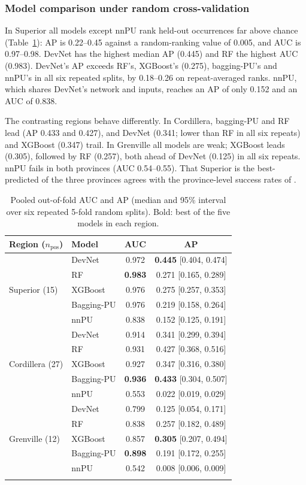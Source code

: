 \documentclass[pdflatex,sn-apa]{sn-jnl}
\begin{document}
\subsubsection{Model comparison under random cross-validation}\label{sec:res-random}

In Superior all models except nnPU rank held-out occurrences far above chance (Table~\ref{tab:benchmark}): AP is 0.22--0.45 against a random-ranking value of 0.005, and AUC is 0.97--0.98. DevNet has the highest median AP (0.445) and RF the highest AUC (0.983). DevNet's AP exceeds RF's, XGBoost's (0.275), bagging-PU's and nnPU's in all six repeated splits, by 0.18--0.26 on repeat-averaged ranks. nnPU, which shares DevNet's network and inputs, reaches an AP of only 0.152 and an AUC of 0.838.

The contrasting regions behave differently. In Cordillera, bagging-PU and RF lead (AP 0.433 and 0.427), and DevNet (0.341; lower than RF in all six repeats) and XGBoost (0.347) trail. In Grenville all models are weak; XGBoost leads (0.305), followed by RF (0.257), both ahead of DevNet (0.125) in all six repeats. nnPU fails in both provinces (AUC 0.54--0.55). That Superior is the best-predicted of the three provinces agrees with the province-level success rates of \citet{Parsa2024}.

\begin{table}[t]
\caption{Pooled out-of-fold AUC and AP (median and 95\% interval over six repeated 5-fold random splits). Bold: best of the five models in each region.}\label{tab:benchmark}
\footnotesize
\begin{tabular*}{\textwidth}{@{\extracolsep\fill}llcc}
\toprule
Region ($n_{\mathrm{pos}}$) & Model & AUC & AP \\
\midrule
\multirow{5}{*}{Superior (15)} & DevNet & 0.972 & \textbf{0.445} [0.404, 0.474] \\
 & RF & \textbf{0.983} & 0.271 [0.165, 0.289] \\
 & XGBoost & 0.976 & 0.275 [0.257, 0.353] \\
 & Bagging-PU & 0.976 & 0.219 [0.158, 0.264] \\
 & nnPU & 0.838 & 0.152 [0.125, 0.191] \\
\midrule
\multirow{5}{*}{Cordillera (27)} & DevNet & 0.914 & 0.341 [0.299, 0.394] \\
 & RF & 0.931 & 0.427 [0.368, 0.516] \\
 & XGBoost & 0.927 & 0.347 [0.316, 0.380] \\
 & Bagging-PU & \textbf{0.936} & \textbf{0.433} [0.304, 0.507] \\
 & nnPU & 0.553 & 0.022 [0.019, 0.029] \\
\midrule
\multirow{5}{*}{Grenville (12)} & DevNet & 0.799 & 0.125 [0.054, 0.171] \\
 & RF & 0.838 & 0.257 [0.182, 0.489] \\
 & XGBoost & 0.857 & \textbf{0.305} [0.207, 0.494] \\
 & Bagging-PU & \textbf{0.898} & 0.191 [0.172, 0.255] \\
 & nnPU & 0.542 & 0.008 [0.006, 0.009] \\
\botrule
\end{tabular*}
\end{table}
\end{document}
